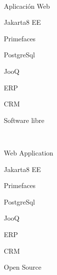 \begin{multicols}{2}
\begin{description}
\item [\palabraschaveprincipal:] \mbox{} \\[-20pt]
\item Aplicación Web
\item Jakarta8 EE
\item Primefaces
\item PostgreSql
\item JooQ
\item ERP
\item CRM
\item Software libre
\end{description}
\begin{description}
\item [\palabraschavesecundaria:] \mbox{} \\[-20pt]
\item Web Application
\item Jakarta8 EE
\item Primefaces
\item PostgreSql
\item JooQ
\item ERP
\item CRM
\item Open Source
\end{description}
\end{multicols}
